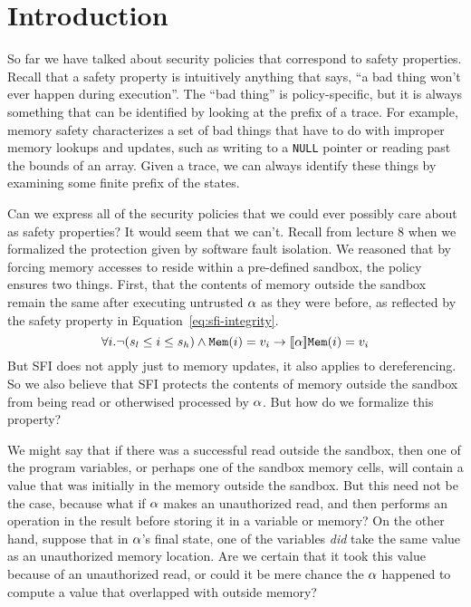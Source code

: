 \documentclass[11pt,twoside]{scrartcl}
\begin{document}
\newcommand{\atrace}{\sigma}%
\newcommand{\stdI}{\dTLint[state=\omega]}%
\newcommand{\Ip}{\dTLint[trace=\atrace]}%
\newcommand{\ws}{\omega}\newcommand{\wt}{\nu}%

\maketitle
\thispagestyle{empty}


\section{Introduction}

So far we have talked about security policies that correspond to safety properties. Recall that a safety property is intuitively anything that says, ``a bad thing won't ever happen during execution''. The ``bad thing'' is policy-specific, but it is always something that can be identified by looking at the prefix of a trace. For example, memory safety characterizes a set of bad things that have to do with improper memory lookups and updates, such as writing to a \verb'NULL' pointer or reading past the bounds of an array. Given a trace, we can always identify these things by examining some finite prefix of the states.

Can we express all of the security policies that we could ever possibly care about as safety properties? It would seem that we can't. Recall from lecture 8 when we formalized the protection given by software fault isolation. We reasoned that by forcing memory accesses to reside within a pre-defined sandbox, the policy ensures two things. First, that the contents of memory outside the sandbox remain the same after executing untrusted $\alpha$ as they were before, as reflected by the safety property in Equation~\ref{eq:sfi-integrity}.
\begin{equation}
\label{eq:sfi-integrity}
\forall i . \lnot(s_l \le i \le s_h)  \land \pderef{i}=v_i \limply \dbox{\asprg}{\pderef{i}=v_i}
\end{equation}
But SFI does not apply just to memory updates, it also applies to dereferencing. So we also believe that SFI protects the contents of memory outside the sandbox from being read or otherwised processed by $\alpha$. But how do we formalize this property? 

We might say that if there was a successful read outside the sandbox, then one of the program variables, or perhaps one of the sandbox memory cells, will contain a value that was initially in the memory outside the sandbox. But this need not be the case, because what if $\alpha$ makes an unauthorized read, and then performs an operation in the result before storing it in a variable or memory? On the other hand, suppose that in $\alpha$'s final state, one of the variables \emph{did} take the same value as an unauthorized memory location. Are we certain that it took this value because of an unauthorized read, or could it be mere chance the $\alpha$ happened to compute a value that overlapped with outside memory?
\end{document}

